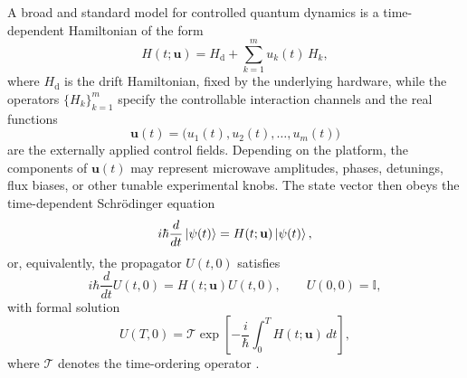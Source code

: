 A broad and standard model for controlled quantum dynamics is a time-dependent Hamiltonian of the form
\begin{equation}
H\!\left(t;\mathbf{u}\right)
=
H_{\mathrm{d}}
+
\sum_{k=1}^{m} u_k(t)\, H_k,
\label{eq:control_hamiltonian}
\end{equation}
where $H_{\mathrm{d}}$ is the drift Hamiltonian, fixed by the underlying hardware, while the operators $\{H_k\}_{k=1}^{m}$ specify the controllable interaction channels and the real functions
\begin{equation}
\mathbf{u}(t) = \bigl(u_1(t),u_2(t),\dots,u_m(t)\bigr)
\label{eq:control_vector}
\end{equation}
are the externally applied control fields. Depending on the platform, the components of $\mathbf{u}(t)$ may represent microwave amplitudes, phases, detunings, flux biases, or other tunable experimental knobs. The state vector then obeys the time-dependent Schr\"odinger equation
\begin{equation}
i\hbar \frac{d}{dt}\ket{\psi(t)}
=
H\!\left(t;\mathbf{u}\right)\ket{\psi(t)},
\label{eq:schrodinger_equation_control}
\end{equation}
or, equivalently, the propagator $U(t,0)$ satisfies
\begin{equation}
i\hbar \frac{d}{dt} U(t,0)
=
H\!\left(t;\mathbf{u}\right) U(t,0),
\qquad
U(0,0)=\mathbb{I},
\label{eq:propagator_differential_equation}
\end{equation}
with formal solution
\begin{equation}
U(T,0)
=
\mathcal{T}
\exp\!\left[
-\frac{i}{\hbar}
\int_0^T H\!\left(t;\mathbf{u}\right)\,dt
\right],
\label{eq:time_ordered_propagator}
\end{equation}
where $\mathcal{T}$ denotes the time-ordering operator \cite{Palao2003,Koch2022,Mahesh2023}.

